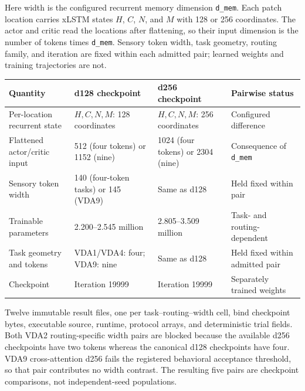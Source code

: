 \documentclass[11pt,a4paper]{article}
\begin{document}
Here width is the configured recurrent memory dimension \texttt{d\_mem}. Each patch location carries xLSTM states $H$, $C$, $N$, and $M$ with 128 or 256 coordinates. The actor and critic read the locations after flattening, so their input dimension is the number of tokens times \texttt{d\_mem}. Sensory token width, task geometry, routing family, and iteration are fixed within each admitted pair; learned weights and training trajectories are not.

\begingroup\small
{}\label{tab:width-comparison}
\begin{tabularx}{\textwidth}{@{}p{4.0cm}Y Y Y@{}}
\toprule
Quantity & d128 checkpoint & d256 checkpoint & Pairwise status\\
\midrule
Per-location recurrent state & $H,C,N,M$: 128 coordinates & $H,C,N,M$: 256 coordinates & Configured difference\\
Flattened actor/critic input & 512 (four tokens) or 1152 (nine) & 1024 (four tokens) or 2304 (nine) & Consequence of \texttt{d\_mem}\\
Sensory token width & 140 (four-token tasks) or 145 (VDA9) & Same as d128 & Held fixed within pair\\
Trainable parameters & 2.200--2.545 million & 2.805--3.509 million & Task- and routing-dependent\\
Task geometry and tokens & VDA1/VDA4: four; VDA9: nine & Same as d128 & Held fixed within admitted pair\\
Checkpoint & Iteration 19999 & Iteration 19999 & Separately trained weights\\
\bottomrule
\end{tabularx}
\endgroup

Twelve immutable result files, one per task--routing--width cell, bind checkpoint bytes, executable source, runtime, protocol arrays, and deterministic trial fields. Both VDA2 routing-specific width pairs are blocked because the available d256 checkpoints have two tokens whereas the canonical d128 checkpoints have four. VDA9 cross-attention d256 fails the registered behavioral acceptance threshold, so that pair contributes no width contrast. The resulting five pairs are checkpoint comparisons, not independent-seed populations.
\end{document}
